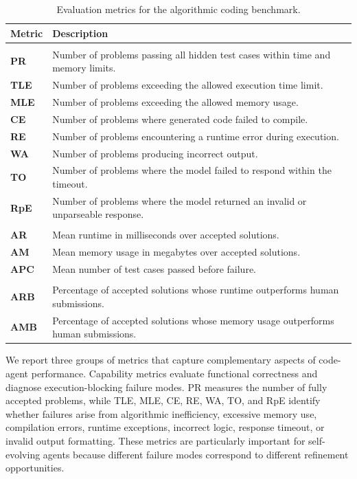 \begin{table}[H]
  \centering
  \footnotesize
  \renewcommand{\arraystretch}{0.85}
  \setlength{\tabcolsep}{4pt}
  \caption{Evaluation metrics for the algorithmic coding benchmark.}
  \label{tab:coding-metrics}
  \begin{tabular}{p{1.2cm}p{9cm}}
  \toprule
  \textbf{Metric} & \textbf{Description} \\
  \midrule
  \rowcolor{gray!15} \multicolumn{2}{c}{\textbf{Capability metrics}} \\
  \textbf{PR}  & Number of problems passing all hidden test cases within time and memory limits. \\
  \textbf{TLE} & Number of problems exceeding the allowed execution time limit. \\
  \textbf{MLE} & Number of problems exceeding the allowed memory usage. \\
  \textbf{CE}  & Number of problems where generated code failed to compile. \\
  \textbf{RE}  & Number of problems encountering a runtime error during execution. \\
  \textbf{WA}  & Number of problems producing incorrect output. \\
  \textbf{TO}  & Number of problems where the model failed to respond within the timeout. \\
  \textbf{RpE} & Number of problems where the model returned an invalid or unparseable response. \\
  \midrule
  \rowcolor{gray!15} \multicolumn{2}{c}{\textbf{Efficiency metrics}} \\
  \textbf{AR}  & Mean runtime in milliseconds over accepted solutions. \\
  \textbf{AM}  & Mean memory usage in megabytes over accepted solutions. \\
  \textbf{APC} & Mean number of test cases passed before failure. \\
  \midrule
  \rowcolor{gray!15} \multicolumn{2}{c}{\textbf{Human-referenced metrics}} \\
  \textbf{ARB} & Percentage of accepted solutions whose runtime outperforms human submissions. \\
  \textbf{AMB} & Percentage of accepted solutions whose memory usage outperforms human submissions. \\
  \bottomrule
  \end{tabular}
\end{table}

We report three groups of metrics that capture complementary aspects of code-agent performance. Capability metrics evaluate functional correctness and diagnose execution-blocking failure modes. PR measures the number of fully accepted problems, while TLE, MLE, CE, RE, WA, TO, and RpE identify whether failures arise from algorithmic inefficiency, excessive memory use, compilation errors, runtime exceptions, incorrect logic, response timeout, or invalid output formatting. These metrics are particularly important for self-evolving agents because different failure modes correspond to different refinement opportunities.

